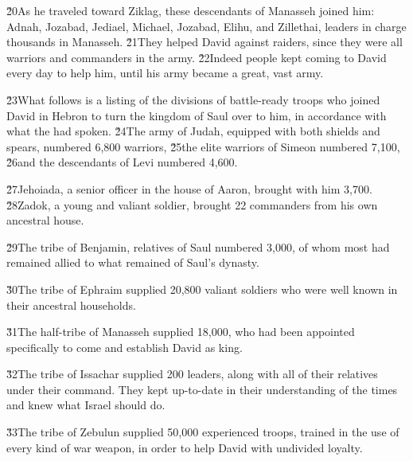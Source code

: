 \v{20}As he traveled toward Ziklag, these descendants of Manasseh joined him: Adnah, Jozabad, Jediael, Michael, Jozabad, Elihu, and Zillethai, leaders in charge thousands in Manasseh. \v{21}They helped David against raiders, since they were all warriors and commanders in the army. \v{22}Indeed people kept coming to David every day to help him, until his army became a great, vast army.

\v{23}What follows is a listing of the divisions of battle-ready troops who joined David in Hebron to turn the kingdom of Saul over to him, in accordance with what the  had spoken. \v{24}The army of Judah, equipped with both shields and spears, numbered 6,800 warriors, \v{25}the elite warriors of Simeon numbered 7,100, \v{26}and the descendants of Levi numbered 4,600.

\v{27}Jehoiada, a senior officer in the house of Aaron, brought with him 3,700. \v{28}Zadok, a young and valiant soldier, brought 22 commanders from his own ancestral house.

\v{29}The tribe of Benjamin, relatives of Saul numbered 3,000, of whom most had remained allied to what remained of Saul's dynasty.

\v{30}The tribe of Ephraim supplied 20,800 valiant soldiers who were well known in their ancestral households.

\v{31}The half-tribe of Manasseh supplied 18,000, who had been appointed specifically to come and establish David as king.

\v{32}The tribe of Issachar supplied 200 leaders, along with all of their relatives under their command. They kept up-to-date in their understanding of the times and knew what Israel should do.

\v{33}The tribe of Zebulun supplied 50,000 experienced troops, trained in the use of every kind of war weapon, in order to help David with undivided loyalty.

